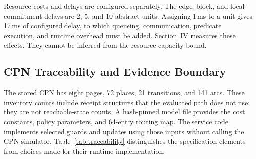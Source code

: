 Resource costs and delays are configured separately. The edge, block, and
local-commitment delays are 2, 5, and 10 abstract units. Assigning 1\,ms
to a unit gives 17\,ms of configured delay, to which queueing, communication,
predicate execution, and runtime overhead must be added. Section~IV measures
these effects. They cannot be inferred from the resource-capacity bound.

\subsection{CPN Traceability and Evidence Boundary}

The stored CPN has eight pages, 72 places, 21 transitions, and 141 arcs.
These inventory counts include receipt structures that the evaluated path
does not use; they are not reachable-state counts. A hash-pinned model file
provides the cost constants, policy parameters, and 64-entry routing map.
The service code implements selected guards and updates using those inputs
without calling the CPN simulator. Table~\ref{tab:traceability} distinguishes
the specification elements from choices made for their runtime implementation.

